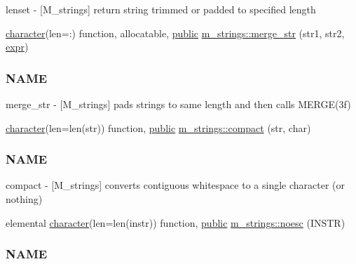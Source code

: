 \begin{DoxyCompactItemize}
\begin{DoxyCompactList}
lenset -\/ \mbox{[}M\+\_\+strings\mbox{]} return string trimmed or padded to specified length \end{DoxyCompactList}\item 
\hyperlink{option__stopwatch_83_8txt_abd4b21fbbd175834027b5224bfe97e66}{character}(len=\+:) function, allocatable, \hyperlink{M__stopwatch_83_8txt_a2f74811300c361e53b430611a7d1769f}{public} \hyperlink{namespacem__strings_aba5a8d7fc092b38d1939f37a13247c1e}{m\+\_\+strings\+::merge\+\_\+str} (str1, str2, \hyperlink{do_87_8txt_a74df008f496b23fc41b7a113e6fc2270}{expr})
\begin{DoxyCompactList}\small\item\em \subsubsection*{N\+A\+ME}

merge\+\_\+str -\/ \mbox{[}M\+\_\+strings\mbox{]} pads strings to same length and then calls M\+E\+R\+G\+E(3f) \end{DoxyCompactList}\item 
\hyperlink{option__stopwatch_83_8txt_abd4b21fbbd175834027b5224bfe97e66}{character}(len=len(str)) function, \hyperlink{M__stopwatch_83_8txt_a2f74811300c361e53b430611a7d1769f}{public} \hyperlink{namespacem__strings_a929c032267cb990ad4991fab4aed1d57}{m\+\_\+strings\+::compact} (str, char)
\begin{DoxyCompactList}\small\item\em \subsubsection*{N\+A\+ME}

compact -\/ \mbox{[}M\+\_\+strings\mbox{]} converts contiguous whitespace to a single character (or nothing) \end{DoxyCompactList}\item 
elemental \hyperlink{option__stopwatch_83_8txt_abd4b21fbbd175834027b5224bfe97e66}{character}(len=len(instr)) function, \hyperlink{M__stopwatch_83_8txt_a2f74811300c361e53b430611a7d1769f}{public} \hyperlink{namespacem__strings_a5d72fde097444c689f1822c5ad95e03d}{m\+\_\+strings\+::noesc} (I\+N\+S\+TR)
\begin{DoxyCompactList}\small\item\em \subsubsection*{N\+A\+ME}


\end{DoxyCompactList}
\end{DoxyCompactItemize}
